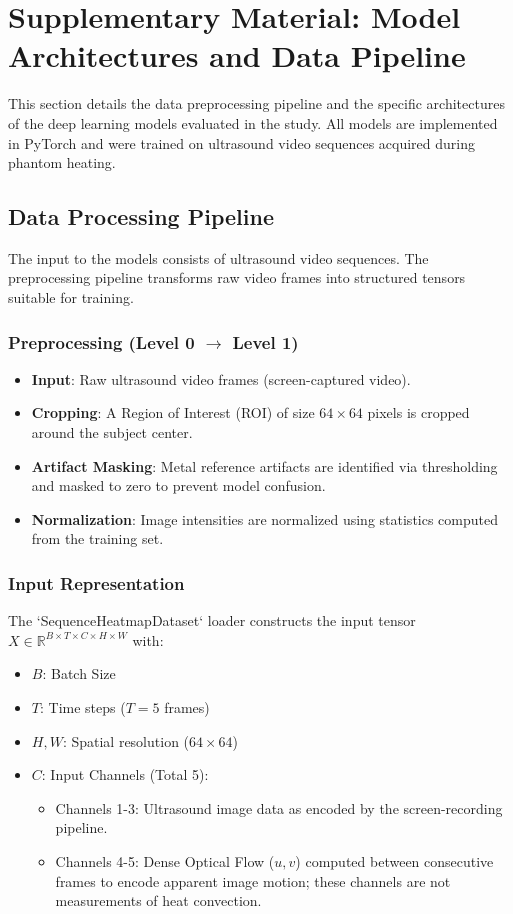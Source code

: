 \section{Supplementary Material: Model Architectures and Data Pipeline}
\label{sec:supplementary}

This section details the data preprocessing pipeline and the specific architectures of the deep learning models evaluated in the study. All models are implemented in PyTorch and were trained on ultrasound video sequences acquired during phantom heating.

\subsection{Data Processing Pipeline}
The input to the models consists of ultrasound video sequences. The preprocessing pipeline transforms raw video frames into structured tensors suitable for training.

\subsubsection{Preprocessing (Level 0 $\to$ Level 1)}
\begin{itemize}
    \item \textbf{Input}: Raw ultrasound video frames (screen-captured video).
    \item \textbf{Cropping}: A Region of Interest (ROI) of size $64 \times 64$ pixels is cropped around the subject center.
    \item \textbf{Artifact Masking}: Metal reference artifacts are identified via thresholding and masked to zero to prevent model confusion.
    \item \textbf{Normalization}: Image intensities are normalized using statistics computed from the training set.
\end{itemize}

\subsubsection{Input Representation}
The `SequenceHeatmapDataset` loader constructs the input tensor $X \in \mathbb{R}^{B \times T \times C \times H \times W}$ with:
\begin{itemize}
    \item $B$: Batch Size
    \item $T$: Time steps ($T=5$ frames)
    \item $H, W$: Spatial resolution ($64 \times 64$)
    \item $C$: Input Channels (Total 5):
    \begin{itemize}
        \item Channels 1-3: Ultrasound image data as encoded by the screen-recording pipeline.
        \item Channels 4-5: Dense Optical Flow ($u, v$) computed between consecutive frames to encode apparent image motion; these channels are not measurements of heat convection.
    \end{itemize}
\end{itemize}

